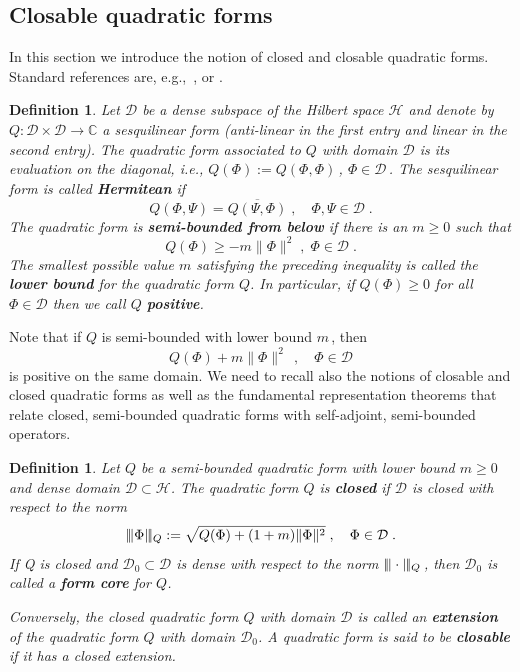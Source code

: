 \documentclass[a4paper,12pt]{amsart}
\newcommand{\norm}[1]{\|#1\|}
\newcommand{\normm}[1]{|\negthinspace\|#1\|\negthinspace|}
\renewcommand{\H}{\mathcal{H}}
\newcommand{\D}{\mathcal{D}}
\newcommand{\1}{\mathbb{I}}
\newtheorem{definition}[theorem]{Definition}
\numberwithin{equation}{section}
\numberwithin{theorem}{section}
\begin{document}
\subsection{Closable quadratic forms} \label{sec:closableqf}

In this section we introduce the notion of closed and closable quadratic forms. Standard references are,
e.g.,~\cite[Chapter~VI]{kato95}, \cite[Section~VIII.6]{reed80} or \cite[Section~4.4]{davies95}.

\begin{definition}
Let $\D$ be a dense subspace of the Hilbert space $\H$ and denote by $Q\colon\mathcal{D}\times\mathcal{D}\to \mathbb{C}$
a sesquilinear form (anti-linear in the first entry and linear in the second entry). The quadratic form associated to $Q$
with domain $\mathcal D$ is its evaluation on the diagonal, i.e., $Q(\Phi):=Q(\Phi,\Phi)$\,,
$\Phi\in\mathcal{D}$\,. The sesquilinear form is called \textbf{Hermitean} if
\[
  Q(\Phi,\Psi)=\overline{Q(\Psi,\Phi)}\;,\quad \Phi,\Psi\in\mathcal{D}\;.
\]
The quadratic form is  \textbf{semi-bounded from below} if there is an $m\geq 0$ such that
\[
  Q(\Phi)\geq -m \norm{\Phi}^2\;,\; \Phi \in \mathcal{D}\;.
\]
The smallest possible value $m$ satisfying the preceding inequality is called the \textbf{lower bound} for the quadratic form $Q$.
In particular, if  $Q(\Phi)\geq 0$ for all $\Phi\in\mathcal{D}$ then we call $Q$ \textbf{positive}.

\end{definition}

Note that if $Q$ is semi-bounded with lower bound $m$\,, then
$$Q(\Phi)+m\norm{\Phi}^2\;\,,\quad \Phi\in\D$$
is positive on the same domain.
We need to recall also the notions of closable and closed quadratic forms as
well as the fundamental representation theorems that relate closed, semi-bounded quadratic forms with self-adjoint, semi-bounded operators.

\begin{definition}
Let $Q$ be a semi-bounded quadratic form with lower bound $m\geq 0$ and dense domain $\D\subset\H$.
The quadratic form $Q$ is \textbf{closed} if $\D$ is closed with respect to the norm
\[
 \normm{\Phi}_Q:=\sqrt{Q(\Phi)+(1+m)\|\Phi\|^2}\;,\quad\Phi\in\D\;.
\]
If Q is closed and $\D_0\subset\D$ is dense with respect to the norm $\normm{\cdot}_Q$\,, then $\D_0$ is called a
\textbf{form core} for $Q$.

Conversely, the closed quadratic form $Q$ with domain $\D$ is called an
\textbf{extension} of the quadratic form $Q$ with domain $\D_0$. A quadratic form is said to be
\textbf{closable} if it has a closed extension.
\end{definition}
\end{document}
